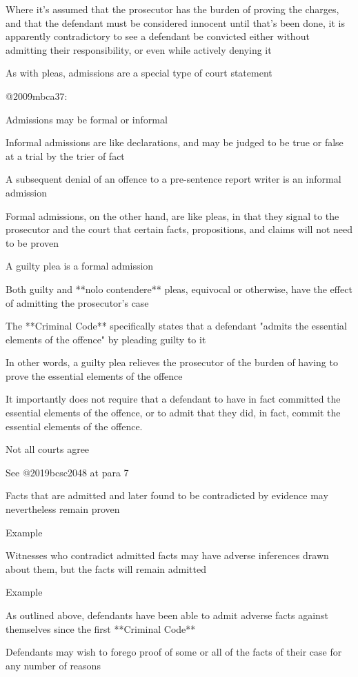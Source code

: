 Where it's assumed that the prosecutor has the burden of proving the charges, and that the defendant must be considered innocent until that's been done, it is apparently contradictory to see a defendant be convicted either without admitting their responsibility, or even while actively denying it

As with pleas, admissions are a special type of court statement

@2009mbca37:

Admissions may be formal or informal

Informal admissions are like declarations, and may be judged to be true or false at a trial by the trier of fact

A subsequent denial of an offence to a pre-sentence report writer is an informal admission

Formal admissions, on the other hand, are like pleas, in that they signal to the prosecutor and the court that certain facts, propositions, and claims will not need to be proven

A guilty plea is a formal admission

Both guilty and **nolo contendere** pleas, equivocal or otherwise, have the effect of admitting the prosecutor's case

The **Criminal Code** specifically states that a defendant "admits the essential elements of the offence" by pleading guilty to it

In other words, a guilty plea relieves the prosecutor of the burden of having to prove the essential elements of the offence

It importantly does not require that a defendant to have in fact committed the essential elements of the offence, or to admit that they did, in fact, commit the essential elements of the offence.

Not all courts agree

See @2019bcsc2048 at para 7

Facts that are admitted and later found to be contradicted by evidence may nevertheless remain proven

Example

Witnesses who contradict admitted facts may have adverse inferences drawn about them, but the facts will remain admitted

Example

As outlined above, defendants have been able to admit adverse facts against themselves since the first **Criminal Code**

Defendants may wish to forego proof of some or all of the facts of their case for any number of reasons

